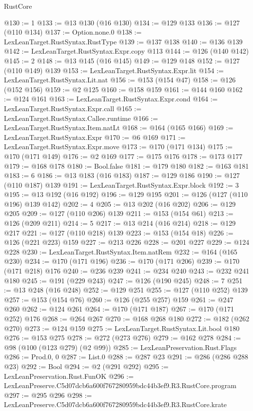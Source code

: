 \begin{lexlean}{RustCore}
\begin{coremodule}
@130 := 1
@133 := @13 @130 (@16 @130)
@134 := @129 @133
@136 := @127 (@110 @134)
@137 := Option.none.{0}
@138 := LexLeanTarget.RustSyntax.RustType
@139 := @137 @138
@140 := @136 @139
@142 := LexLeanTarget.RustSyntax.Expr.copy @113
@144 := @126 (@140 @142)
@145 := 2
@148 := @13 @145 (@16 @145)
@149 := @129 @148
@152 := @127 (@110 @149) @139
@153 := LexLeanTarget.RustSyntax.Expr.lit
@154 := LexLeanTarget.RustSyntax.Lit.nat
@156 := @153 (@154 @47)
@158 := @126 (@152 @156)
@159 := @2 @125
@160 := @158 @159
@161 := @144 @160
@162 := @124 @161
@163 := LexLeanTarget.RustSyntax.Expr.cond
@164 := LexLeanTarget.RustSyntax.Expr.call
@165 := LexLeanTarget.RustSyntax.Callee.runtime
@166 := LexLeanTarget.RustSyntax.Item.natLt
@168 := @164 (@165 @166)
@169 := LexLeanTarget.RustSyntax.Expr
@170 := @6 @169
@171 := LexLeanTarget.RustSyntax.Expr.move
@173 := @170 (@171 @134)
@175 := @170 (@171 @149)
@176 := @2 @169
@177 := @175 @176
@178 := @173 @177
@179 := @168 @178
@180 := Bool.false
@181 := @179 @180
@182 := @163 @181
@183 := 6
@186 := @13 @183 (@16 @183)
@187 := @129 @186
@190 := @127 (@110 @187) @139
@191 := LexLeanTarget.RustSyntax.Expr.block
@192 := 3
@195 := @13 @192 (@16 @192)
@196 := @129 @195
@201 := @126 (@127 (@110 @196) @139 @142)
@202 := 4
@205 := @13 @202 (@16 @202)
@206 := @129 @205
@209 := @127 (@110 @206) @139
@211 := @153 (@154 @61)
@213 := @126 (@209 @211)
@214 := 5
@217 := @13 @214 (@16 @214)
@218 := @129 @217
@221 := @127 (@110 @218) @139
@223 := @153 (@154 @18)
@226 := @126 (@221 @223) @159
@227 := @213 @226
@228 := @201 @227
@229 := @124 @228
@230 := LexLeanTarget.RustSyntax.Item.natRem
@232 := @164 (@165 @230)
@234 := @170 (@171 @196)
@236 := @170 (@171 @206)
@239 := @170 (@171 @218) @176
@240 := @236 @239
@241 := @234 @240
@243 := @232 @241 @180
@245 := @191 (@229 @243)
@247 := @126 (@190 @245)
@248 := 7
@251 := @13 @248 (@16 @248)
@252 := @129 @251
@255 := @127 (@110 @252) @139
@257 := @153 (@154 @76)
@260 := @126 (@255 @257) @159
@261 := @247 @260
@262 := @124 @261
@264 := @170 (@171 @187)
@267 := @170 (@171 @252) @176
@268 := @264 @267
@270 := @168 @268 @180
@272 := @182 (@262 @270)
@273 := @124 @159
@275 := LexLeanTarget.RustSyntax.Lit.bool @180
@276 := @153 @275
@278 := @272 (@273 @276)
@279 := @162 @278
@284 := @98 (@100 (@123 @279) (@2 @99))
@285 := LexLeanPreservation.Rust.Flags
@286 := Prod.{0, 0}
@287 := List.{0}
@288 := @287 @23
@291 := @286 (@286 @288 @23)
@292 := Bool
@294 := @2 (@291 @292)
@295 := LexLeanPreservation.Rust.FunOK
@296 := LexLeanPreserve.C5d07dcb6a600f767280959bdc44b3ef9.R3.RustCore.program
@297 := @295 @296
@298 := LexLeanPreserve.C5d07dcb6a600f767280959bdc44b3ef9.R3.RustCore.krate

\end{coremodule}
\end{lexlean}
